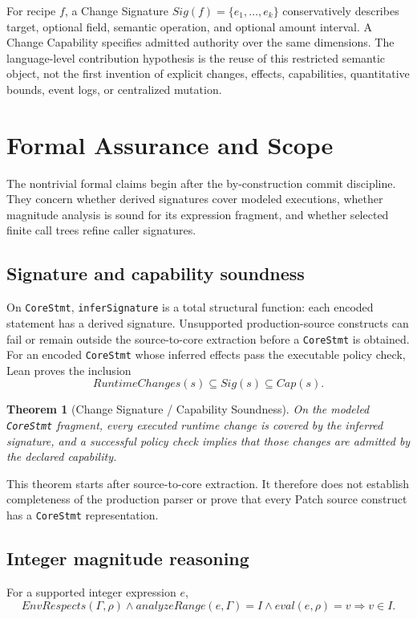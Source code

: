 \documentclass[10pt]{article}
\theoremstyle{plain}
\newtheorem{theorem}{Theorem}
\theoremstyle{remark}
\begin{document}
For recipe $f$, a Change Signature $Sig(f)=\{e_1,\ldots,e_k\}$ conservatively describes target, optional field, semantic operation, and optional amount interval. A Change Capability specifies admitted authority over the same dimensions. The language-level contribution hypothesis is the reuse of this restricted semantic object, not the first invention of explicit changes, effects, capabilities, quantitative bounds, event logs, or centralized mutation.

\section{Formal Assurance and Scope}
\label{sec:formal}
The nontrivial formal claims begin after the by-construction commit discipline. They concern whether derived signatures cover modeled executions, whether magnitude analysis is sound for its expression fragment, and whether selected finite call trees refine caller signatures.

\subsection{Signature and capability soundness}
On \texttt{CoreStmt}, \texttt{inferSignature} is a total structural function: each encoded statement has a derived signature. Unsupported production-source constructs can fail or remain outside the source-to-core extraction before a \texttt{CoreStmt} is obtained. For an encoded \texttt{CoreStmt} whose inferred effects pass the executable policy check, Lean proves the inclusion
\[
RuntimeChanges(s) \subseteq Sig(s) \subseteq Cap(s).
\]

\begin{theorem}[Change Signature / Capability Soundness]
\label{thm:signature}
On the modeled \texttt{CoreStmt} fragment, every executed runtime change is covered by the inferred signature, and a successful policy check implies that those changes are admitted by the declared capability.
\end{theorem}

This theorem starts after source-to-core extraction. It therefore does not establish completeness of the production parser or prove that every Patch source construct has a \texttt{CoreStmt} representation.

\subsection{Integer magnitude reasoning}
For a supported integer expression $e$,
\[
EnvRespects(\Gamma,\rho) \wedge analyzeRange(e,\Gamma)=I \wedge eval(e,\rho)=v
\Longrightarrow v\in I.
\]
\end{document}
